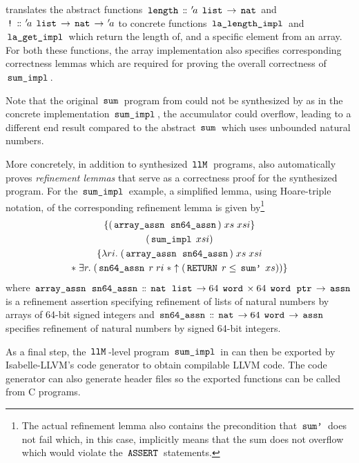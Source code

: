  translates the abstract functions $\,\text{\ttfamily length}\, \mathrel{\mathord{:}\mkern-1.2mu\mathord{:}} {\mskip2mu '\mskip-2mua} \; \,\text{\ttfamily list}\, \rightarrow \,\text{\ttfamily nat}\,$ and $\,\text{\ttfamily !}\, \mathrel{\mathord{:}\mkern-1.2mu\mathord{:}} {\mskip2mu '\mskip-2mua} \; \,\text{\ttfamily list}\, \rightarrow \,\text{\ttfamily nat}\, \rightarrow {\mskip2mu '\mskip-2mua}$ to concrete functions $\,\text{\ttfamily la\_length\_impl}\,$ and $\,\text{\ttfamily la\_get\_impl}\,$ which return the length of, and a specific element from an array.
For both these functions, the array implementation also specifies corresponding correctness lemmas which are required for proving the overall correctness of $\,\text{\ttfamily sum\_impl}\,$.

Note that the original $\,\text{\ttfamily sum}\,$ program from  could not be synthesized by  as in the concrete implementation $\,\text{\ttfamily sum\_impl}\,$, the accumulator could overflow, leading to a different end result compared to the abstract $\,\text{\ttfamily sum}\,$ which uses unbounded natural numbers.

More concretely, in addition to synthesized $\,\text{\ttfamily llM}\,$ programs,  also automatically proves \textit{refinement lemmas} that serve as a correctness proof for the synthesized program.
For the $\,\text{\ttfamily sum\_impl}\,$ example, a simplified lemma, using Hoare-triple notation, of the corresponding refinement lemma is given by\footnote{The actual refinement lemma also contains the precondition that $\,\text{\ttfamily sum'}\,$ does not fail which, in this case, implicitly means that the sum does not overflow which would violate the $\,\text{\ttfamily ASSERT}\,$ statements.}
\begin{gather*}
	\{(\,\text{\ttfamily array\_assn}\, \; \,\text{\ttfamily sn64\_assn}\,) \; xs \; xsi\}\\
	(\,\text{\ttfamily sum\_impl}\, \; xsi) \\
	\{\lambda ri. \; (\,\text{\ttfamily array\_assn}\, \; \,\text{\ttfamily sn64\_assn}\,) \; xs \; xsi \\
	\ast \; \exists r. \; (\,\text{\ttfamily sn64\_assn}\, \; r \; ri \; \ast \uparrow(\,\text{\ttfamily RETURN}\, \; r \leq \,\text{\ttfamily sum'}\, \; xs))\}
\end{gather*}
where $\,\text{\ttfamily array\_assn}\, \; \,\text{\ttfamily sn64\_assn}\, \mathrel{\mathord{:}\mkern-1.2mu\mathord{:}} \,\text{\ttfamily nat}\, \; \,\text{\ttfamily list}\, \rightarrow 64 \; \,\text{\ttfamily word}\, \times 64 \; \,\text{\ttfamily word}\, \; \,\text{\ttfamily ptr}\, \rightarrow \,\text{\ttfamily assn}\,$ is a refinement assertion specifying refinement of lists of natural numbers by arrays of 64-bit signed integers and $\,\text{\ttfamily sn64\_assn}\, \mathrel{\mathord{:}\mkern-1.2mu\mathord{:}} \,\text{\ttfamily nat}\, \rightarrow 64 \; \,\text{\ttfamily word}\, \rightarrow \,\text{\ttfamily assn}\,$ specifies refinement of natural numbers by signed 64-bit integers.

As a final step, the $\,\text{\ttfamily llM}\,$-level program $\,\text{\ttfamily sum\_impl}\,$ in  can then be exported by Isabelle-LLVM's code generator to obtain compilable LLVM code.
The code generator can also generate header files so the exported functions can be called from C programs.


